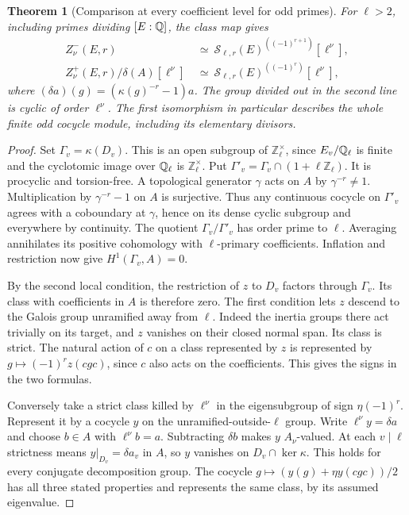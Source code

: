 \documentclass[a4paper,11pt]{article}
\newtheorem{theorem}[proposition]{Theorem}
\theoremstyle{definition}
\theoremstyle{remark}
\newcommand{\ZZ}{\mathbb Z}\newcommand{\ord}{\operatorname{ord}}
\numberwithin{equation}{section}
\begin{document}
\begin{theorem}[Comparison at every coefficient level for odd primes]
\leavevmode\label{thm:oddstrict675}
For \(\ell>2\), including primes dividing \([E:\mathbb Q]\), the class
map gives
\[
 \begin{aligned}
 Z^-_\nu(E,r)&\ \simeq\
     \mathcal S_{\ell,r}(E)^{((-1)^{r+1})}[\ell^\nu],\\
 Z^+_\nu(E,r)/\delta(A)[\ell^\nu]&\ \simeq\
     \mathcal S_{\ell,r}(E)^{((-1)^r)}[\ell^\nu],
 \end{aligned}
\]
where \((\delta a)(g)=(\kappa(g)^{-r}-1)a\).
The group divided out in the second line is cyclic of order
\(\ell^\nu\). The first isomorphism in particular describes the
whole finite odd cocycle module, including its elementary divisors.
\end{theorem}
\begin{proof}
Set \(\Gamma_v=\kappa(D_v)\). This is an open subgroup of
\(\ZZ_\ell^\times\), since \(E_v/\mathbb Q_\ell\) is finite and the
cyclotomic image over \(\mathbb Q_\ell\) is \(\ZZ_\ell^\times\).
Put \(\Gamma'_v=\Gamma_v\cap(1+\ell\ZZ_\ell)\).
It is procyclic and torsion-free. A topological generator
\(\gamma\) acts on \(A\) by \(\gamma^{-r}\ne1\).
Multiplication by \(\gamma^{-r}-1\) on \(A\) is surjective.
Thus any continuous cocycle on \(\Gamma'_v\) agrees with a
coboundary at \(\gamma\), hence on its dense cyclic subgroup
and everywhere by continuity. The quotient \(\Gamma_v/\Gamma'_v\)
has order prime to \(\ell\). Averaging annihilates its positive
cohomology with \(\ell\)-primary coefficients. Inflation and
restriction now give \(H^1(\Gamma_v,A)=0\).

By the second local condition, the restriction of \(z\) to
\(D_v\) factors through \(\Gamma_v\). Its class with coefficients
in \(A\) is therefore zero. The first condition lets \(z\)
descend to the Galois group unramified away from \(\ell\).
Indeed the inertia groups there act trivially on its target, and
\(z\) vanishes on their closed normal span. Its class is strict.
The natural action of \(c\) on a class represented by \(z\)
is represented by \(g\mapsto(-1)^r z(cgc)\), since \(c\)
also acts on the coefficients. This gives the signs in the
two formulas.

Conversely take a strict class killed by \(\ell^\nu\) in the
eigensubgroup of sign \(\eta(-1)^r\). Represent it by a cocycle
\(y\) on the unramified-outside-\(\ell\) group. Write
\(\ell^\nu y=\delta a\) and choose \(b\in A\) with
\(\ell^\nu b=a\). Subtracting \(\delta b\) makes \(y\)
\(A_\nu\)-valued. At each \(v\mid\ell\) strictness means
\(y|_{D_v}=\delta a_v\) in \(A\), so \(y\) vanishes on
\(D_v\cap\ker\kappa\). This holds for every conjugate
decomposition group. The cocycle
\(g\mapsto(y(g)+\eta y(cgc))/2\) has all three stated properties
and represents the same class, by its assumed eigenvalue.


\end{proof}
\end{document}
